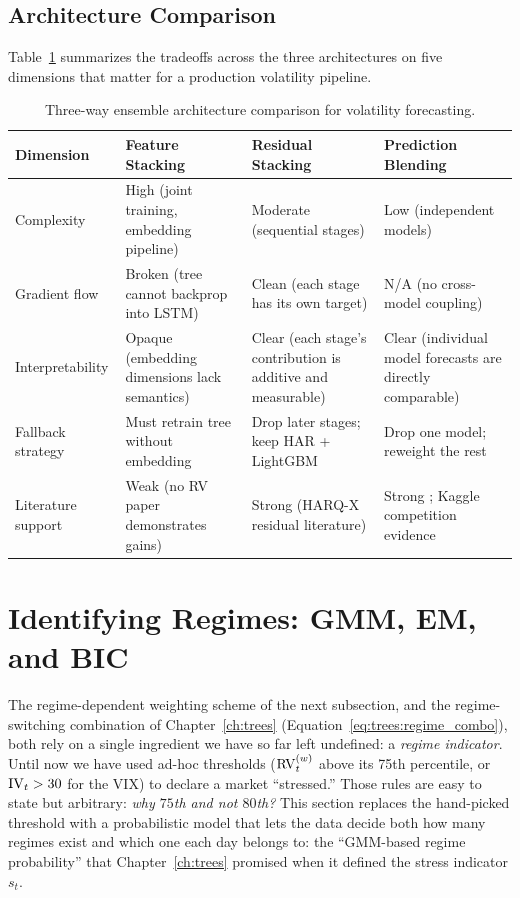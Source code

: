 \subsection{Architecture Comparison}\label{sec:hybrid:arch-compare}

Table~\ref{tab:arch-comparison} summarizes the tradeoffs across the
three architectures on five dimensions that matter for a production
volatility pipeline.

\begin{table}[htbp]
\centering
\caption{Three-way ensemble architecture comparison for volatility
  forecasting.}
\label{tab:arch-comparison}
\small
\begin{tabular}{@{}p{2.4cm}p{3.0cm}p{3.0cm}p{3.5cm}@{}}
\toprule
\textbf{Dimension}
  & \textbf{Feature Stacking}
  & \textbf{Residual Stacking}
  & \textbf{Prediction Blending} \\
\midrule
Complexity
  & High (joint training, embedding pipeline)
  & Moderate (sequential stages)
  & Low (independent models) \\
\addlinespace
Gradient flow
  & Broken (tree cannot backprop into LSTM)
  & Clean (each stage has its own target)
  & N/A (no cross-model coupling) \\
\addlinespace
Interpretability
  & Opaque (embedding dimensions lack semantics)
  & Clear (each stage's contribution is additive and measurable)
  & Clear (individual model forecasts are directly comparable) \\
\addlinespace
Fallback strategy
  & Must retrain tree without embedding
  & Drop later stages; keep HAR + LightGBM
  & Drop one model; reweight the rest \\
\addlinespace
Literature support
  & Weak (no RV paper demonstrates gains)
  & Strong (HARQ-X residual literature)
  & Strong \citep{Optiver2021}; Kaggle competition evidence \\
\bottomrule
\end{tabular}
\end{table}


\section{Identifying Regimes: GMM, EM, and BIC}
\label{sec:hybrid:regimes}

The regime-dependent weighting scheme of the next subsection, and the
regime-switching combination of Chapter~\ref{ch:trees}
(Equation~\eqref{eq:trees:regime_combo}), both rely on a single ingredient
we have so far left undefined: a \emph{regime indicator}.  Until now we
have used ad-hoc thresholds ($\operatorname{RV}_t^{(w)}$ above its 75th percentile,
or $\operatorname{IV}_t > 30$ for the VIX) to declare a market ``stressed.''  Those
rules are easy to state but arbitrary: \emph{why $75$th and not $80$th?}
This section replaces the
hand-picked threshold with a probabilistic model that lets the data decide
both how many regimes exist and which one each day belongs to: the
``GMM-based regime probability'' that Chapter~\ref{ch:trees} promised when
it defined the stress indicator $s_t$.

